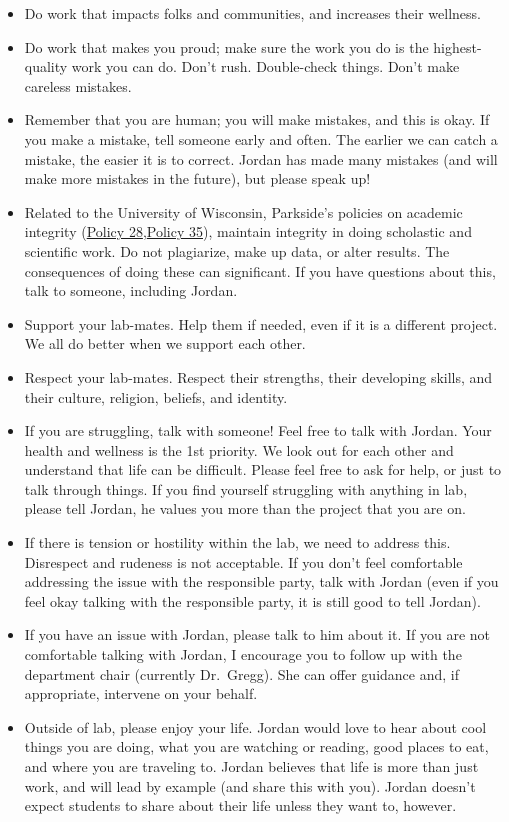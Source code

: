 \documentclass[
]{book}
\begin{document}
\begin{itemize}
\item
  Do work that impacts folks and communities, and increases their wellness.
\item
  Do work that makes you proud; make sure the work you do is the highest-quality work you can do. Don't rush. Double-check things. Don't make careless mistakes.
\item
  Remember that you are human; you will make mistakes, and this is okay. If you make a mistake, tell someone early and often. The earlier we can catch a mistake, the easier it is to correct. Jordan has made many mistakes (and will make more mistakes in the future), but please speak up!
\item
  Related to the University of Wisconsin, Parkside's policies on academic integrity (\href{https://www.uwp.edu/explore/offices/governance/policy28.cfm}{Policy 28},\href{https://www.uwp.edu/explore/offices/governance/policy35.cfm}{Policy 35}), maintain integrity in doing scholastic and scientific work. Do not plagiarize, make up data, or alter results. The consequences of doing these can significant. If you have questions about this, talk to someone, including Jordan.
\item
  Support your lab-mates. Help them if needed, even if it is a different project. We all do better when we support each other.
\item
  Respect your lab-mates. Respect their strengths, their developing skills, and their culture, religion, beliefs, and identity.
\item
  If you are struggling, talk with someone! Feel free to talk with Jordan. Your health and wellness is the 1st priority. We look out for each other and understand that life can be difficult. Please feel free to ask for help, or just to talk through things. If you find yourself struggling with anything in lab, please tell Jordan, he values you more than the project that you are on.
\item
  If there is tension or hostility within the lab, we need to address this. Disrespect and rudeness is not acceptable. If you don't feel comfortable addressing the issue with the responsible party, talk with Jordan (even if you feel okay talking with the responsible party, it is still good to tell Jordan).
\item
  If you have an issue with Jordan, please talk to him about it. If you are not comfortable talking with Jordan, I encourage you to follow up with the department chair (currently Dr.~Gregg). She can offer guidance and, if appropriate, intervene on your behalf.
\item
  Outside of lab, please enjoy your life. Jordan would love to hear about cool things you are doing, what you are watching or reading, good places to eat, and where you are traveling to. Jordan believes that life is more than just work, and will lead by example (and share this with you). Jordan doesn't expect students to share about their life unless they want to, however.
\end{itemize}
\end{document}
